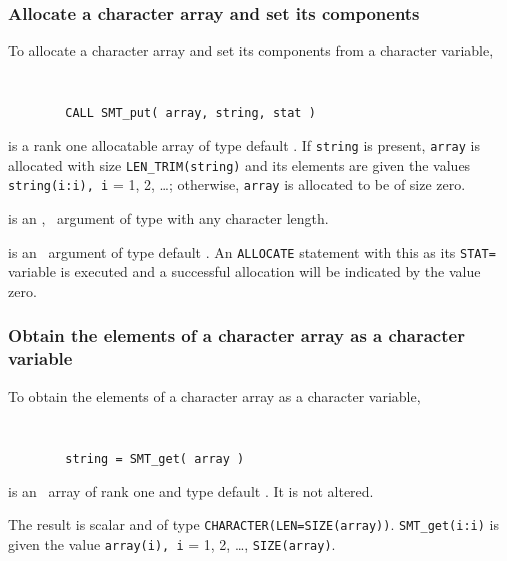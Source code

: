 \documentclass{galahad}
\begin{document}
\subsubsection{Allocate a character array and set its components}

To allocate a character array and set its components from a character variable,
\vspace*{-2mm}
{\tt 
\begin{verbatim}
        CALL SMT_put( array, string, stat )
\end{verbatim}
}
\vspace*{-4mm}
\begin{description}

 is a rank one allocatable array of type default \character.
If {\tt string} is present, {\tt array} is allocated with size 
{\tt LEN\_TRIM(string)} and
its elements are given the values {\tt string(i:i), i} = 1, 2, \ldots ;
otherwise, {\tt array} is allocated to be of size zero.

 is an \optional, \intentin\ argument of type \character
with any character length. 

 is an 
\intentout\ argument of type default \integer.
An {\tt ALLOCATE} statement with this as its {\tt STAT=}
variable is executed and a successful allocation will be indicated
by the value zero. 
\end{description}

\subsubsection{Obtain the elements of a character array as a character variable}

To obtain the elements of a character array as a character variable,
\vspace*{-2mm}
{\tt 
\begin{verbatim}
        string = SMT_get( array )
\end{verbatim}
}
\vspace*{-4mm}
\begin{description}

 is an \intentin\ array of rank one and type default \character.
It is not altered.
\end{description}
The result is scalar and of type {\tt CHARACTER(LEN=SIZE(array))}.
{\tt SMT\_get(i:i)} is given the value {\tt array(i), i} = 1, 2, \ldots ,
{\tt SIZE(array)}.
\end{document}
